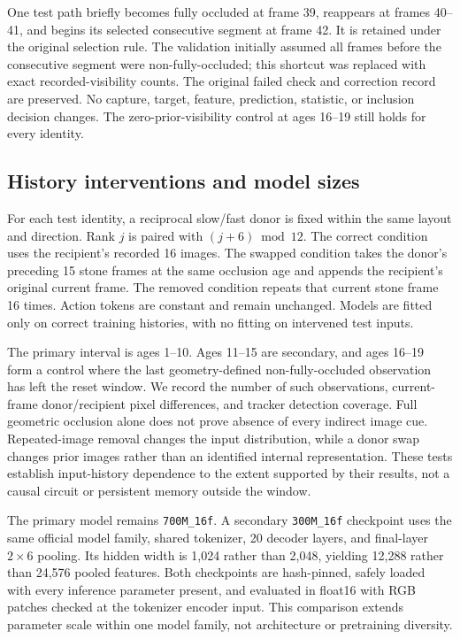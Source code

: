 One test path briefly becomes fully occluded at frame 39, reappears at frames 40--41, and begins its selected consecutive segment at frame 42. It is retained under the original selection rule. The validation initially assumed all frames before the consecutive segment were non-fully-occluded; this shortcut was replaced with exact recorded-visibility counts. The original failed check and correction record are preserved. No capture, target, feature, prediction, statistic, or inclusion decision changes. The zero-prior-visibility control at ages 16--19 still holds for every identity.

\subsection{History interventions and model sizes}
For each test identity, a reciprocal slow/fast donor is fixed within the same layout and direction. Rank $j$ is paired with $(j+6)\bmod 12$. The correct condition uses the recipient's recorded 16 images. The swapped condition takes the donor's preceding 15 stone frames at the same occlusion age and appends the recipient's original current frame. The removed condition repeats that current stone frame 16 times. Action tokens are constant and remain unchanged. Models are fitted only on correct training histories, with no fitting on intervened test inputs.

The primary interval is ages 1--10. Ages 11--15 are secondary, and ages 16--19 form a control where the last geometry-defined non-fully-occluded observation has left the reset window. We record the number of such observations, current-frame donor/recipient pixel differences, and tracker detection coverage. Full geometric occlusion alone does not prove absence of every indirect image cue. Repeated-image removal changes the input distribution, while a donor swap changes prior images rather than an identified internal representation. These tests establish input-history dependence to the extent supported by their results, not a causal circuit or persistent memory outside the window.

The primary model remains \texttt{700M\_16f}. A secondary \texttt{300M\_16f} checkpoint uses the same official model family, shared tokenizer, 20 decoder layers, and final-layer $2\times6$ pooling. Its hidden width is 1,024 rather than 2,048, yielding 12,288 rather than 24,576 pooled features. Both checkpoints are hash-pinned, safely loaded with every inference parameter present, and evaluated in float16 with RGB patches checked at the tokenizer encoder input. This comparison extends parameter scale within one model family, not architecture or pretraining diversity.

